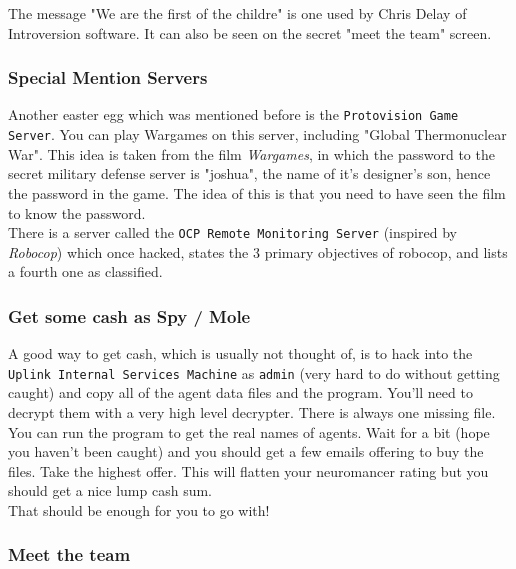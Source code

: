 \documentclass[11pt,twoside,a4paper]{book}
\begin{document}
{The message "We are the first of the childre" is one used by Chris Delay of Introversion software. It can also be seen on the secret "meet the team" screen. %

\subsubsection{Special Mention Servers}

Another easter egg which was mentioned before is the \texttt{Protovision Game Server}. You can play Wargames on this server, including "Global Thermonuclear War". This idea is taken from the film \emph{Wargames}, in which the password to the secret military defense server is "joshua", the name of it's designer's son, hence the password in the game. The idea of this is that you need to have seen the film to know the password. ~\\

There is a server called the \texttt{OCP Remote Monitoring Server} (inspired by \emph{Robocop}) which once hacked, states the 3 primary objectives of robocop, and lists a fourth one as classified. %

\subsubsection{Get some cash as Spy / Mole}

A good way to get cash, which is usually not thought of, is to hack into the \texttt{Uplink Internal Services Machine} as \texttt{admin} (very hard to do without getting caught) and copy all of the agent data files and the program. You'll need to decrypt them with a very high level decrypter. There is always one missing file. You can run the program to get the real names of agents. Wait for a bit (hope you haven't been caught) and you should get a few emails offering to buy the files. Take the highest offer. This will flatten your neuromancer rating but you should get a nice lump cash sum. ~\\

That should be enough for you to go with!

\subsubsection{Meet the team}

}
\end{document}
